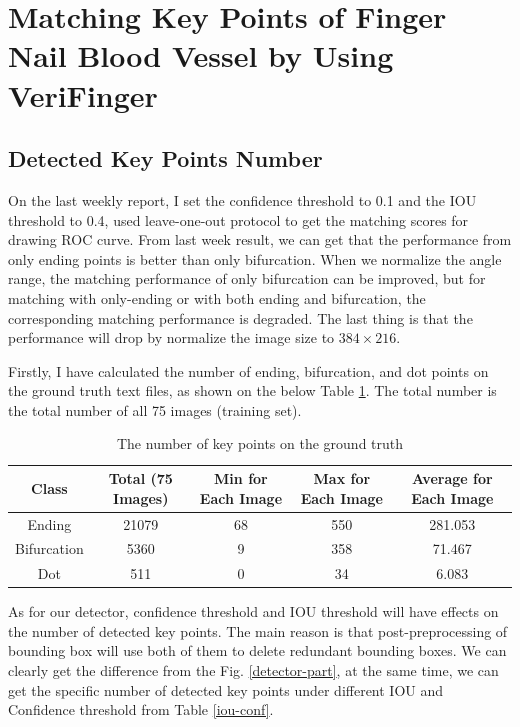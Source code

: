 \section{Matching Key Points of Finger Nail Blood Vessel by Using VeriFinger}
\subsection{Detected Key Points Number}

On the last weekly report, I set the confidence threshold to 0.1 and the IOU threshold to 0.4, used leave-one-out protocol to get the matching scores for drawing ROC curve. From last week result, we can get that the performance from only ending points is better than only bifurcation. When we normalize the angle range, the matching performance of only bifurcation can be improved, but for matching with only-ending or with both ending and bifurcation, the corresponding matching performance is degraded. The last thing is that the performance will drop by normalize the image size to $384\times216$.

Firstly, I have calculated the number of ending, bifurcation, and dot points on the ground truth text files, as shown on the below Table \ref{ground-truth}. The total number is the total number of all 75 images (training set).

\begin{table}[h]
    \centering
    \caption{The number of key points on the ground truth}
    \begin{tabular}{ccccc}
    \hline
    Class       & Total (75 Images) & Min for Each Image & Max for Each Image & Average for Each Image \\ \hline
    Ending      & 21079             & 68                 & 550                & 281.053               \\
    Bifurcation & 5360              & 9                  & 358                & 71.467                 \\
    Dot         & 511               & 0                  & 34                 & 6.083                  \\ \hline
    \end{tabular}
    \label{ground-truth}
\end{table}

As for our detector, confidence threshold and IOU threshold will have effects on the number of detected key points. The main reason is that post-preprocessing of bounding box will use both of them to delete redundant bounding boxes. We can clearly get the difference from the Fig. \ref{detector-part}, at the same time, we can get the specific number of detected key points under different IOU and Confidence threshold from Table \ref{iou-conf}. 

